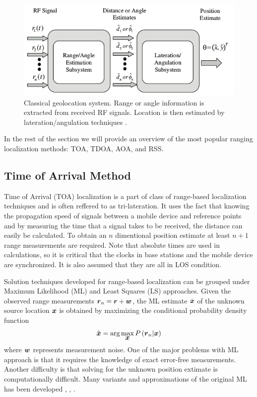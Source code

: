 \begin{figure}[h]
\centering
\includegraphics[width=1.0\textwidth]{figures/localization_example.png}
\caption{Classical geolocation system. Range or angle information is extracted from received RF signals. Location is then estimated by lateration/angulation techniques \cite{GeoLoc}.}
\label{fig:2step}
\end{figure}


In the rest of the section we will provide an overview of the most popular ranging localization methods: TOA, TDOA, AOA, and RSS.



\subsection{Time of Arrival Method}

Time of Arrival (TOA) localization is a part of class of range-based localization techniques and is often reffered to as tri-lateration. It uses the fact that knowing the propagation speed of  signals between a mobile device and reference points and by measuring the time that a signal takes to be received, the distance can easily be calculated. To obtain an $n$  dimentional position estimate at least $n+1$ range measurements are required. Note that absolute times are used in calculations, so it is critical that the  clocks in base stations and the mobile device are synchronized. It is also assumed that they are all in LOS condition. %

Solution techniques developed for range-based localization can be grouped under Maximum Likelihood (ML) and Least Squares (LS) approaches. 
Given the observed range measurements $\mbox{\boldmath$r$}_n = \mbox{\boldmath$r$} + \mbox{\boldmath$w$}$, the ML estimate $\hat{\mbox{\boldmath$x$}}$ of the unknown source location $\mbox{\boldmath$x$}$ is obtained by maximizing the conditional probability density function 
\begin{equation}
\nonumber
\hat{\mbox{\boldmath$x$}} = \mbox{arg}\max_{\mbox{\boldmath$x$}} P\left(\mbox{\boldmath$r$}_n|\mbox{\boldmath$x$}\right)
\end{equation}
where $\mbox{\boldmath$w$}$ represents measurement noise. One of the major problems with ML approach is that it requires the knowledge of exact error-free measurements. Another difficulty is that solving for the unknown position extimate is computationally difficult. Many variants and approximations of the original ML has been  developed \cite{Guvenc}, \cite{Guvenc2}, \cite{HoML}.

